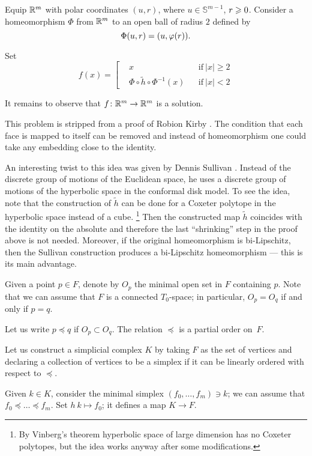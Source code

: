 Equip $\mathbb{R}^m$ with polar coordinates $(u,r)$, 
where $u\in\mathbb{S}^{m-1}$, $r\z\ge 0$.
Consider a homeomorphism $\Phi$ from $\mathbb{R}^m$ to an open ball of radius $2$
defined by 
\[\Phi(u,r)\z=(u,\phi(r)).\]

Set 
\[
f(x)=\left[
\begin{aligned}
&x&&\text{if}\ |x|\ge 2
\\
&\Phi\circ \tilde h \circ \Phi^{-1}(x)&&\text{if}\ |x|< 2
\end{aligned}
\right.
\]

It remains to observe that $f\colon\mathbb{R}^m\to\mathbb{R}^m$ is a solution.
\qeds

This problem is stripped from a proof of Robion Kirby \cite{kirby}.
The condition that each face is mapped to itself can be removed and 
instead of homeomorphism one could take any embedding close to the identity.

An interesting twist to this idea was given by Dennis Sullivan \cite{sullivan}.
Instead of the discrete group of motions of the Euclidean space,
he uses a discrete group of motions of the hyperbolic space in the conformal disk model.
To see the idea, note that the construction of $\tilde h$ can be done for a Coxeter polytope in the hyperbolic space instead of a cube.%
\footnote{By Vinberg's theorem \cite{vinberg, vinberg-strong} hyperbolic space of large dimension has no Coxeter polytopes, but the idea works anyway after some modifications.}
Then the constructed map $\tilde h$
coincides with the identity on the absolute and therefore the last ``shrinking'' step in the proof above is not needed.
Moreover, 
if the original homeomorphism is bi-Lipschitz,
then the Sullivan construction produces a bi-Lipschitz homeomorphism ---
this is its main advantage.

  

Given a point $p\in F$,
denote by $O_p$ the minimal open set in $F$ containing $p$. 
Note that we can assume that $F$ is a connected $T_0$-space;
in particular, $O_p=O_q$ if and only if $p=q$.

Let us write $p\preccurlyeq q$ 
if $O_p\subset O_q$.
The relation $\preccurlyeq$ is a partial order on~$F$.

Let us construct a simplicial complex $K$ 
by taking $F$ as the set of vertices
and declaring a collection of vertices to be a simplex 
if it can be linearly ordered with respect to $\preccurlyeq$.

Given $k\in K$,
consider the minimal simplex $(f_0,\dots,f_m)\ni k$;
we can assume that $f_0\preccurlyeq \dots\preccurlyeq f_m$.
Set $h\:k\mapsto f_0$;
it defines a map $K\to F$.

